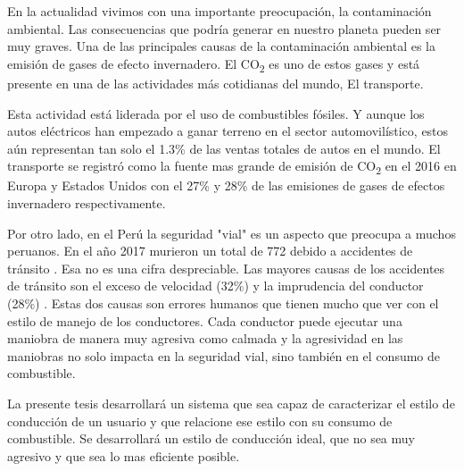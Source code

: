 \begin{introduction}

En la actualidad vivimos con una importante preocupación, la contaminación ambiental. Las consecuencias que podría generar en nuestro planeta pueden ser muy graves. Una de las principales causas de la contaminación ambiental es la emisión de gases de efecto invernadero. El CO\textsubscript{2} es uno de estos gases y está presente en una de las actividades más cotidianas del mundo, El transporte.

Esta actividad está liderada por el uso de combustibles fósiles. Y aunque los autos eléctricos han empezado a ganar terreno en el sector automovilístico, estos aún representan tan solo el 1.3\% de las ventas totales de autos en el mundo.  El transporte se registró como la fuente mas grande de emisión de CO\textsubscript{2} en el 2016 en Europa y Estados Unidos con el 27\% y 28\% de las emisiones de gases de efectos invernadero respectivamente.

Por otro lado, en el Perú la seguridad "vial"  es un aspecto que preocupa a muchos peruanos. En el año 2017 murieron un total de 772 debido a accidentes de tránsito . Esa no es una cifra despreciable. Las mayores causas de los accidentes de tránsito son el exceso de velocidad (32\%) y la imprudencia del conductor (28\%) . Estas dos causas son errores humanos que tienen mucho que ver con el estilo de manejo de los conductores. Cada conductor puede ejecutar una maniobra de manera muy agresiva como calmada y la agresividad en las maniobras no solo impacta en la seguridad vial, sino también en el consumo de combustible.

La presente tesis desarrollará un sistema que sea capaz de caracterizar el estilo de conducción de un usuario y que relacione ese estilo con su consumo de combustible. Se desarrollará un estilo de conducción ideal, que no sea muy agresivo y que sea lo mas eficiente posible.


\end{introduction}
